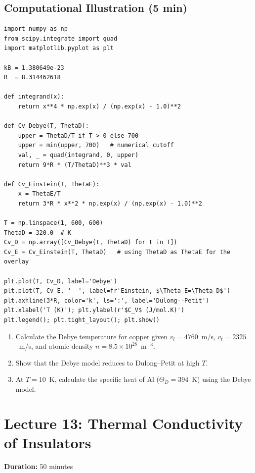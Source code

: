 \documentclass[11pt,a4paper]{article}
\newcommand{\lecheader}[3]{%
  \section{Lecture #1: #2}
  \noindent\textbf{Duration:} #3\par\vspace{4pt}
}
\begin{document}
\subsection{Computational Illustration \hfill \small(5 min)}

\begin{pybox}
\begin{lstlisting}
import numpy as np
from scipy.integrate import quad
import matplotlib.pyplot as plt

kB = 1.380649e-23
R  = 8.314462618

def integrand(x):
    return x**4 * np.exp(x) / (np.exp(x) - 1.0)**2

def Cv_Debye(T, ThetaD):
    upper = ThetaD/T if T > 0 else 700
    upper = min(upper, 700)   # numerical cutoff
    val, _ = quad(integrand, 0, upper)
    return 9*R * (T/ThetaD)**3 * val

def Cv_Einstein(T, ThetaE):
    x = ThetaE/T
    return 3*R * x**2 * np.exp(x) / (np.exp(x) - 1.0)**2

T = np.linspace(1, 600, 600)
ThetaD = 320.0  # K
Cv_D = np.array([Cv_Debye(t, ThetaD) for t in T])
Cv_E = Cv_Einstein(T, ThetaD)   # using ThetaD as ThetaE for the overlay

plt.plot(T, Cv_D, label='Debye')
plt.plot(T, Cv_E, '--', label=fr'Einstein, $\Theta_E=\Theta_D$')
plt.axhline(3*R, color='k', ls=':', label='Dulong--Petit')
plt.xlabel('T (K)'); plt.ylabel(r'$C_V$ (J/mol.K)')
plt.legend(); plt.tight_layout(); plt.show()
\end{lstlisting}
\end{pybox}

\begin{probbox}
\begin{enumerate}
\item Calculate the Debye temperature for copper given $v_l=4760$~m/s,
$v_t=2325$~m/s, and atomic density $n=8.5\times10^{28}$~m$^{-3}$.
\item Show that the Debye model reduces to Dulong--Petit at high $T$.
\item At $T=10$~K, calculate the specific heat of Al ($\Theta_D=394$~K) using the
Debye model.
\end{enumerate}
\end{probbox}

\newpage
\lecheader{13}{Thermal Conductivity of Insulators}{50 minutes}
\end{document}
